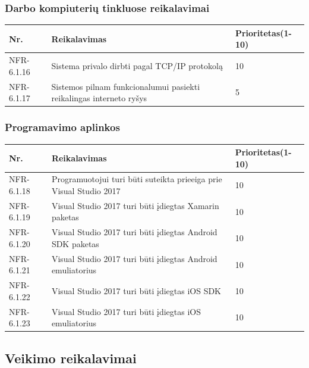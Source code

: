 \documentclass[oneside]{VUMIFPSkursinis}
\begin{document}
\subsubsection{Darbo kompiuterių tinkluose reikalavimai}
\begin{table}[htbp]
	\begin{tabularx}{1\textwidth}{ |P{2.5cm}|X|P{3cm }| }  \hline
		Nr. & Reikalavimas & Prioritetas(1-10) \\ \hline
		NFR-6.1.16 & Sistema privalo dirbti pagal TCP/IP protokolą & 10 \\ \hline
		NFR-6.1.17 & Sistemos pilnam funkcionalumui pasiekti reikalingas interneto ryšys & 5   \\ \hline
	\end{tabularx}
\end{table}
\pagebreak
\subsubsection{Programavimo aplinkos}
\begin{table}[htbp]
	\begin{tabularx}{1\textwidth}{ |P{2.5cm}|X|P{3cm }| }  \hline
		Nr. & Reikalavimas & Prioritetas(1-10) \\ \hline
		NFR-6.1.18 & Programuotojui turi būti suteikta prieeiga prie Visual Studio 2017 & 10 \\ \hline
		NFR-6.1.19 & Visual Studio 2017 turi būti įdiegtas Xamarin paketas & 10 \\ \hline
		NFR-6.1.20 & Visual Studio 2017 turi būti įdiegtas Android SDK paketas & 10 \\ \hline
		NFR-6.1.21 & Visual Studio 2017 turi būti įdiegtas Android emuliatorius & 10 \\ \hline
		NFR-6.1.22 & Visual Studio 2017 turi būti įdiegtas iOS SDK & 10 \\ \hline
		NFR-6.1.23 & Visual Studio 2017 turi būti įdiegtas iOS emuliatorius & 10 \\ \hline
	\end{tabularx}
\end{table}

\pagebreak

\subsection{Veikimo reikalavimai}
\end{document}
